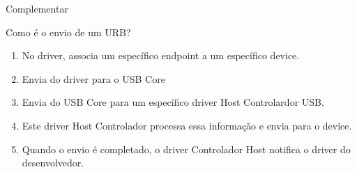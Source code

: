 	\begin{frame}{Complementar}
		\begin{comment}
		\begin{block}{Por que o processamento não fica todo no FPGA?}
			Por ser um hardware extremamente rápido, este ficará exercendo sua função de forma \textbf{dedicada}. Ou seja, se determinado usuário quiser trocar o algoritmo na FPGA, basta ele colocar o novo algoritmo desde que ele funcione por meio de blocos.
		\end{block}

		\begin{block}{Por que não desenvolveu um software em espaço de usuário mais bonito ou funcional? Nem sequer falou de espaço do usuário...}
			O foco do desenvolvimento deste trabalho é justamente a conexão do Kernel ao FPGA. Qualquer software em nível de usuário será tido como trabalho extra.
		\end{block}

		\begin{block}{Poderia ter feito num FPGA com tamanho menor?}
			Sim. Tentou-se desenvolver os algoritmos num Ciclone II, entretanto, este só suporta cerca de 4 mil EL. Então utilizou-se o Ciclone IV disponibilizado pelo IFMG - Formiga que possui cerca de 115 mil.
		\end{block}
		\end{comment}

		\begin{block}{Como é o envio de um URB?}
			\begin{enumerate}
				\item No driver, associa um específico endpoint a um específico device.
				\item Envia do driver para o USB Core
				\item Envia do USB Core para um específico driver Host  Controlardor USB.
				\item Este driver Host Controlador processa essa informação e envia para o device.
				\item Quando o envio é completado, o driver Controlador Host notifica o driver do desenvolvedor.
			\end{enumerate}
		\end{block}


\end{frame}

